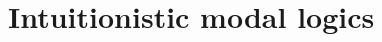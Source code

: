 \documentclass[twoside]{aiml18}
\newcommand{\sonia}[1]{{\color{blue}[Sonia: #1]}}
\newcommand{\lutz}[1]{{\color{green}[Lutz: #1]}}
\begin{document}
%


\section{Intuitionistic modal logics}

\end{document}
